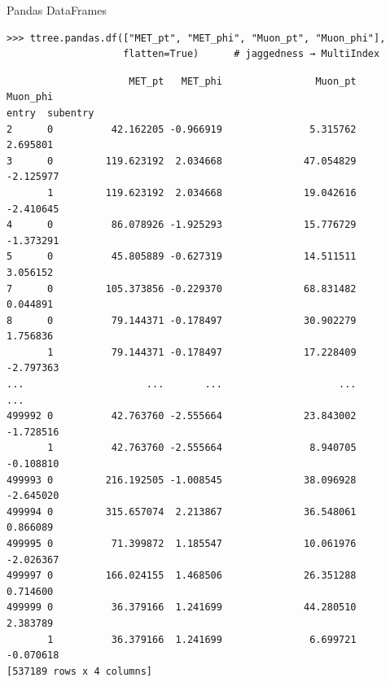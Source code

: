 \documentclass[aspectratio=169]{beamer}
\begin{document}
\begin{frame}[fragile]{Pandas DataFrames}
\small
\begin{verbatim}
>>> ttree.pandas.df(["MET_pt", "MET_phi", "Muon_pt", "Muon_phi"],
                    flatten=True)      # jaggedness → MultiIndex
\end{verbatim}
\scriptsize\color{darkblue}\vspace{-0.75\baselineskip}\begin{verbatim}
                     MET_pt   MET_phi                Muon_pt                 Muon_phi
entry  subentry                                                      
2      0          42.162205 -0.966919               5.315762                 2.695801
3      0         119.623192  2.034668              47.054829                -2.125977
       1         119.623192  2.034668              19.042616                -2.410645
4      0          86.078926 -1.925293              15.776729                -1.373291
5      0          45.805889 -0.627319              14.511511                 3.056152
7      0         105.373856 -0.229370              68.831482                 0.044891
8      0          79.144371 -0.178497              30.902279                 1.756836
       1          79.144371 -0.178497              17.228409                -2.797363
...                     ...       ...                    ...                      ...
499992 0          42.763760 -2.555664              23.843002                -1.728516
       1          42.763760 -2.555664               8.940705                -0.108810
499993 0         216.192505 -1.008545              38.096928                -2.645020
499994 0         315.657074  2.213867              36.548061                 0.866089
499995 0          71.399872  1.185547              10.061976                -2.026367
499997 0         166.024155  1.468506              26.351288                 0.714600
499999 0          36.379166  1.241699              44.280510                 2.383789
       1          36.379166  1.241699               6.699721                -0.070618
[537189 rows x 4 columns]
\end{verbatim}
\end{frame}
\end{document}
